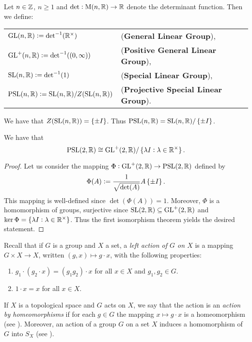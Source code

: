\begin{definition}
	Let $n \in \mathbb{Z}$, $n \geq 1$ and $\mathrm{det} : \mathrm{M}(n,\mathbb{R}) \to \mathbb{R}$ denote the determinant function. Then we define:
	\begin{center}
		\begin{tabular}{ll}
			$\mathrm{GL}(n,\mathbb{R}) := \mathrm{det}^{-1}(\mathbb{R}^\times)$ & (\textbf{General Linear Group}),\\
			$\GLrm^+(n,\Rbb) := \det^{-1}(\intoo{0,\infty})$ & (\textbf{Positive General Linear Group}),\\
			$\mathrm{SL}(n,\mathbb{R}) := \mathrm{det}^{-1}(1)$ & (\textbf{Special Linear Group}),\\
			$\mathrm{PSL}(n,\mathbb{R}) := \mathrm{SL}(n,\mathbb{R})/ Z(\mathrm{SL}(n,\mathbb{R}))$ & (\textbf{Projective Special Linear Group}).\\
		\end{tabular}
	\end{center}
\end{definition}

\begin{remark}
	We have that $Z(\SLrm(n,\Rbb)) = \cbr[0]{\pm I}$. Thus $\PSLrm(n,\Rbb) = \SLrm(n,\Rbb)/\cbr[0]{\pm I}$.
\end{remark}

\begin{lemma}
	We have that
	\begin{equation}
		\PSLrm(2,\Rbb) \cong \GLrm^+(2,\Rbb)/\cbr[0]{\lambda I : \lambda \in \Rbb^\times}.	
	\end{equation}
	\label{lem:isomorphism}
\end{lemma}

\begin{proof}
	Let us consider the mapping $\Phi : \mathrm{GL}^+(2,\mathbb{R}) \to \mathrm{PSL}(2,\mathbb{R})$ defined by
	\begin{equation*}
		\Phi(A) := \frac{1}{\sqrt{\det(A)}} A \cbr[0]{\pm I}.
	\end{equation*}
	This mapping is well-defined since $\det(\Phi(A)) = 1$. Moreover, $\Phi$ is a homomorphism of groups, surjective since $\mathrm{SL}(2,\mathbb{R}) \subseteq \mathrm{GL}^+(2,\mathbb{R})$ and $\ker \Phi = \cbr[0]{\lambda I : \lambda \in \Rbb^\times}$. Thus the first isomorphism theorem yields the desired statement.  
\end{proof}

Recall that if $G$ is a group and $X$ a set, a \emph{left action of $G$ on $X$} is a mapping $G \times X \to X$, written $(g,x) \mapsto g \cdot x$, with the following properties:
\begin{enumerate}[label = \textup{(}\roman*\textup{)}]
	\item $g_1 \cdot (g_2 \cdot x) = (g_1g_2) \cdot x$ for all $x \in X$ and $g_1,g_2 \in G$.
	\item $1 \cdot x = x$ for all $x \in X$.
\end{enumerate}
If $X$ is a topological space and $G$ acts on $X$, we say that the action is an \emph{action by homeomorphisms} if for each $g \in G$ the mapping $x \mapsto g \cdot x$ is a homeomorphism (see \cite[78--79]{lee:topological_manifolds:2011}). Moreover, an action of a group $G$ on a set $X$ induces a homomorphism of $G$ into $S_X$ (see \cite[54]{grillet:abstract_algebra:2007}).

